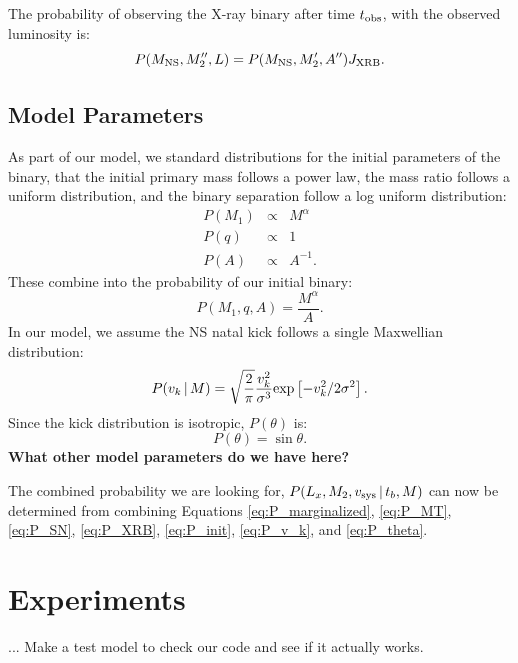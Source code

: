 \documentclass[12pt, preprint]{aastex}
\newcommand{\given}{\,|\,}
\begin{document}
The probability of observing the X-ray binary after time $t_{\rm obs}$, with the observed luminosity is:
\begin{equation}
P(M_{\rm NS}, M''_2, L) = P(M_{\rm NS}, M'_2, A'') J_{\rm XRB}. \label{eq:P_XRB}
\end{equation}



\subsection{Model Parameters}

As part of our model, we standard distributions for the initial parameters of the binary, that the initial primary mass follows a power law, the mass ratio follows a uniform distribution, and the binary separation follow a log uniform distribution:
\begin{eqnarray}
P(M_1) &\propto& M^{\alpha} \\
P(q) &\propto& 1 \\
P(A) &\propto& A^{-1}.
\end{eqnarray}
These combine into the probability of our initial binary:
\begin{equation}
P(M_1, q, A) = \frac{M^{\alpha}}{A}. \label{eq:P_init}
\end{equation}
In our model, we assume the NS natal kick follows a single Maxwellian distribution:
\begin{equation}
P(v_k \given M) = \sqrt{\frac{2}{\pi}} \frac{v_k^2} {\sigma^3} {\rm exp} \left[ -v_k^2 / 2 \sigma^2 \right]. \label{eq:P_v_k}
\end{equation}
Since the kick distribution is isotropic, $P(\theta)$ is:
\begin{equation}
P(\theta) = \sin \theta. \label{eq:P_theta}
\end{equation}
{\bf What other model parameters do we have here?}

The combined probability we are looking for, $P(L_x, M_2, v_{\rm sys} \given t_b, M)$ can now be determined from combining Equations \ref{eq:P_marginalized}, \ref{eq:P_MT}, \ref{eq:P_SN}, \ref{eq:P_XRB}, \ref{eq:P_init}, \ref{eq:P_v_k}, and \ref{eq:P_theta}.



\section{Experiments}

... Make a test model to check our code and see if it actually works.
\end{document}
